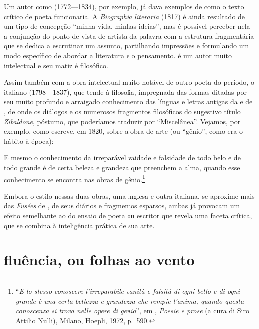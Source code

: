 Um autor como  (1772---1834), por exemplo, já
dava exemplos de como o texto crítico de poeta funcionaria. A
\textit{Biographia literaria} (1817) é ainda resultado de um tipo de
concepção “minha vida, minhas ideias”, mas é possível perceber nela a
conjunção do ponto de vista de artista da palavra com a estrutura
fragmentária que se dedica a escrutinar um assunto, partilhando
impressões e formulando um modo específico de abordar a literatura e o
pensamento.  é um autor muito intelectual e seu matiz é
filosófico.

Assim também com a obra intelectual muito notável de outro poeta
do período, o italiano  (1798---1837), que tende à
filosofia, impregnada das formas ditadas por seu muito profundo e
arraigado conhecimento das línguas e letras antigas da  e de
, de onde os diálogos e os numerosos fragmentos filosóficos do
sugestivo título \textit{Zibaldone}, póstumo, que poderíamos traduzir
por “Miscelânea”. Vejamos, por exemplo, como escreve, em 1820, sobre a
obra de arte (ou “gênio”, como era o hábito à época):

\begin{hedraquote}
E mesmo o conhecimento da irreparável vaidade e falsidade de todo belo e de todo
grande é de certa beleza e grandeza que preenchem a alma, quando
esse conhecimento se encontra nas obras de gênio.\footnote{ ``\textit{E 
lo stesso conoscere l’irreparabile vanità e falsità di ogni bello e di
ogni grande è una certa bellezza e grandezza che rempie l’anima, quando
questa conoscenza si trova nelle opere di genio}'', em , 
\textit{Poesie e prose} (a cura di Siro Attilio Nulli), Milano, Hoepli, 1972, p.~590.}           
\end{hedraquote}

Embora o estilo nessas duas obras, uma inglesa e outra italiana, se
aproxime mais das \textit{Fusées} de , de seus diários e
fragmentos esparsos, ambas já provocam um efeito semelhante ao do
ensaio de poeta ou escritor que revela uma faceta crítica, que se
combina à inteligência prática de sua arte.

\section{fluência, ou folhas ao vento}

